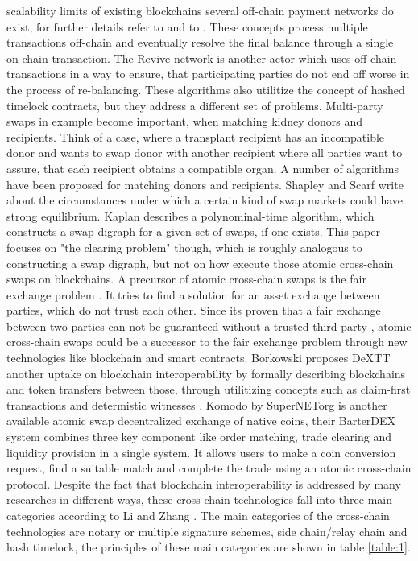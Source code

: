 scalability limits of existing blockchains several off-chain payment networks do exist, for further details refer to \cite{raidennetwork} and to \cite{poon2016bitcoin} \cite{decker2015fast} \cite{green2017bolt}. These concepts process multiple transactions off-chain and eventually resolve the final balance through a single on-chain transaction. The Revive network \cite{khalil2017revive} is another actor which uses off-chain transactions in a way to ensure, that participating parties do not end off worse in the process of re-balancing. These algorithms also utilitize the concept of hashed timelock contracts, but they address a different set of problems. Multi-party swaps in example become important, when matching kidney donors and recipients. Think of a case, where a transplant recipient has an incompatible donor and wants to swap donor with another recipient where all parties want to assure, that each recipient obtains a compatible organ. A number of algorithms \cite{abraham2007clearing} \cite{dickerson2016position} \cite{jia2017efficient} have been proposed for matching donors and recipients. Shapley and Scarf \cite{shapley1974cores} write about the circumstances under which a certain kind of swap markets could have strong equilibrium. Kaplan \cite{kaplan2011improved} describes a polynominal-time algorithm, which constructs a swap digraph for a given set of swaps, if one exists. This paper focuses on "the clearing problem" though, which is roughly analogous to constructing a swap digraph, but not on how execute those atomic cross-chain swaps on blockchains. A precursor of atomic cross-chain swaps is the fair exchange problem \cite{franklin1998secure} \cite{micali2003simple}. It tries to find a solution for an asset exchange between parties, which do not trust each other. Since its proven that a fair exchange between two parties can not be guaranteed without a trusted third party \cite{pagnia1999impossibility}, atomic cross-chain swaps could be a successor to the fair exchange problem through new technologies like blockchain and smart contracts. Borkowski proposes \ac{DeXTT} another uptake on blockchain interoperability by formally describing blockchains and token transfers between those, through utilitizing concepts such as claim-first transactions \cite{borkowski2018caught} and determistic witnesses \cite{borkowski2019dextt}. Komodo \cite{barterdex2020} by SuperNETorg is another available atomic swap decentralized exchange of native coins, their BarterDEX system combines three key component like order matching, trade clearing and liquidity provision in a single system. It allows users to make a coin conversion request, find a suitable match and complete the trade using an atomic cross-chain protocol. Despite the fact that blockchain interoperability is addressed by many researches in different ways, these cross-chain technologies fall into three main categories according to Li and Zhang \cite{li2019research}. The main categories of the cross-chain technologies are notary or multiple signature schemes, side chain/relay chain and hash timelock, the principles of these main categories are shown in table \ref{table:1}. \newline

